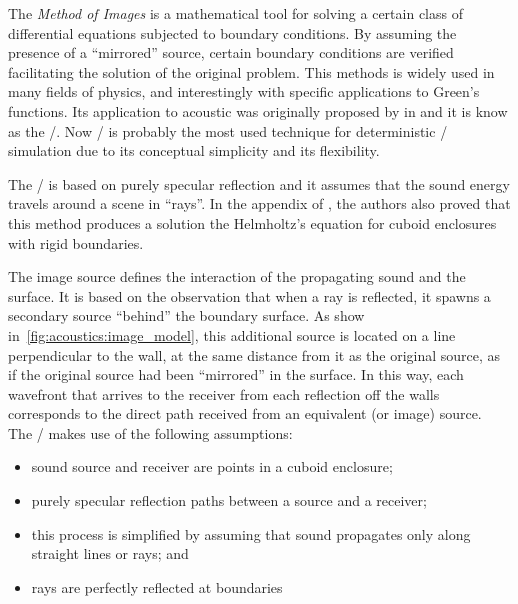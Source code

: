 \begin{figure}
    \resizebox{\linewidth}{!}{
        
    }
    \label{fig:acoustics:3D_ims}
\end{figure}

The \textit{Method of Images} is a mathematical tool for solving a certain class of differential equations subjected to boundary conditions.
By assuming the presence of a ``mirrored'' source, certain boundary conditions are verified facilitating the solution of the original problem.
This methods is widely used in many fields of physics, and interestingly with specific applications to Green's functions.
Its application to acoustic was originally proposed by \citeauthor{allen1979image} in  and it is know as the \ISMdef/.
Now \ISM/ is probably the most used technique for deterministic \RIR/ simulation due to its conceptual simplicity and its flexibility.

The \ISM/ is based on purely specular reflection and it assumes that the sound energy travels around a scene in ``rays''.
In the appendix of , the authors also proved that this method produces a solution the Helmholtz's equation
for cuboid enclosures with rigid boundaries.

\mynewline
The image source defines the interaction of the propagating sound and the surface.
It is based on the observation that when a ray is reflected, it spawns a secondary source ``behind'' the boundary surface.
As show in~\cref{fig:acoustics:image_model}, this additional source is located on a line perpendicular to the wall, at the same distance from it as the original source, as if the original source had been “mirrored” in the surface.
In this way, each wavefront that arrives to the receiver from each reflection off the walls corresponds to the direct path received from an equivalent (or image) source.
\\The \ISM/ makes use of the following assumptions:
\begin{itemize}
    \item sound source and receiver are points in a cuboid enclosure;
    \item purely specular reflection paths between a source and a receiver;
    \item this process is simplified by assuming that sound propagates only along straight lines or rays; and
    \item rays are perfectly reflected at boundaries
\end{itemize}

